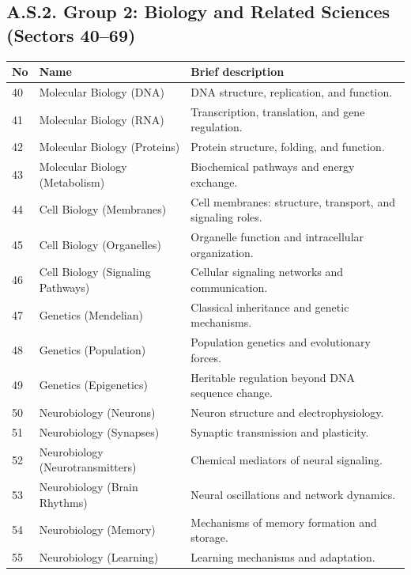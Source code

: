\documentclass[13pt,a4paper]{article}
\begin{document}
	\subsection*{A.S.2. Group 2: Biology and Related Sciences (Sectors 40--69)}
	
	\begin{longtable}{|p{0.9cm}|p{6.0cm}|p{8.6cm}|}
		\hline
		\textbf{No} & \textbf{Name} & \textbf{Brief description} \\
		\hline
		\endhead
		40 & Molecular Biology (DNA) & DNA structure, replication, and function. \\
		\hline
		41 & Molecular Biology (RNA) & Transcription, translation, and gene regulation. \\
		\hline
		42 & Molecular Biology (Proteins) & Protein structure, folding, and function. \\
		\hline
		43 & Molecular Biology (Metabolism) & Biochemical pathways and energy exchange. \\
		\hline
		44 & Cell Biology (Membranes) & Cell membranes: structure, transport, and signaling roles. \\
		\hline
		45 & Cell Biology (Organelles) & Organelle function and intracellular organization. \\
		\hline
		46 & Cell Biology (Signaling Pathways) & Cellular signaling networks and communication. \\
		\hline
		47 & Genetics (Mendelian) & Classical inheritance and genetic mechanisms. \\
		\hline
		48 & Genetics (Population) & Population genetics and evolutionary forces. \\
		\hline
		49 & Genetics (Epigenetics) & Heritable regulation beyond DNA sequence change. \\
		\hline
		50 & Neurobiology (Neurons) & Neuron structure and electrophysiology. \\
		\hline
		51 & Neurobiology (Synapses) & Synaptic transmission and plasticity. \\
		\hline
		52 & Neurobiology (Neurotransmitters) & Chemical mediators of neural signaling. \\
		\hline
		53 & Neurobiology (Brain Rhythms) & Neural oscillations and network dynamics. \\
		\hline
		54 & Neurobiology (Memory) & Mechanisms of memory formation and storage. \\
		\hline
		55 & Neurobiology (Learning) & Learning mechanisms and adaptation. \\

\end{longtable}
\end{document}
